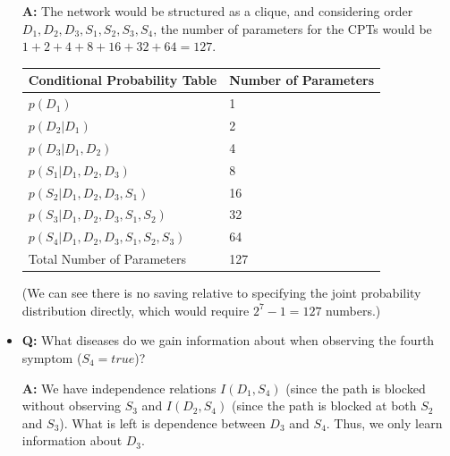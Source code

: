 \documentclass[11pt,letterpaper]{article}
\begin{document}
\begin{itemize}
\begin{solution}
\textbf{A:} The network would be structured as a clique, and considering order $D_1, D_2, D_3, S_1, S_2, S_3, S_4$,
the number of parameters for the CPTs would be $1+2+4+8+16+32+64=127$. 
\begin{center}
\begin{tabular}{|l|l|}
\hline
{Conditional Probability Table}&{Number of Parameters} \\
\hline
\hline
$p(D_1)$&1\\
$p(D_2| D_1 )$&2\\
$p(D_3 | D_1, D_2)$&4\\
$p(S_1|D_1, D_2, D_3)$&8\\
$p(S_2|D_1, D_2, D_3, S_1)$&16\\
$p(S_3|D_1, D_2, D_3, S_1, S_2)$&32\\
$p(S_4|D_1, D_2, D_3, S_1, S_2, S_3)$&64\\
\hline
\hline
Total Number of Parameters&127\\
\hline
\end{tabular}
\end{center} 

(We can see there is no saving
relative to specifying the joint probability distribution directly, which would require $2^7-1=127$ numbers.)\\
\end{solution}


%



%
%
\item \textbf{Q:} What diseases do we gain information about when 
observing the fourth symptom ($S_4= true$)? 

\begin{solution}
\textbf{A:} We have independence relations $I(D_1,S_4)$ (since the path is blocked
without observing $S_3$ and $I(D_2, S_4)$ (since the path is blocked at both $S_2$
and $S_3$). What is left is dependence between $D_3$ and $S_4$. Thus, we only
learn information about $D_3$.\\
\end{solution}


\end{itemize}
\end{document}
